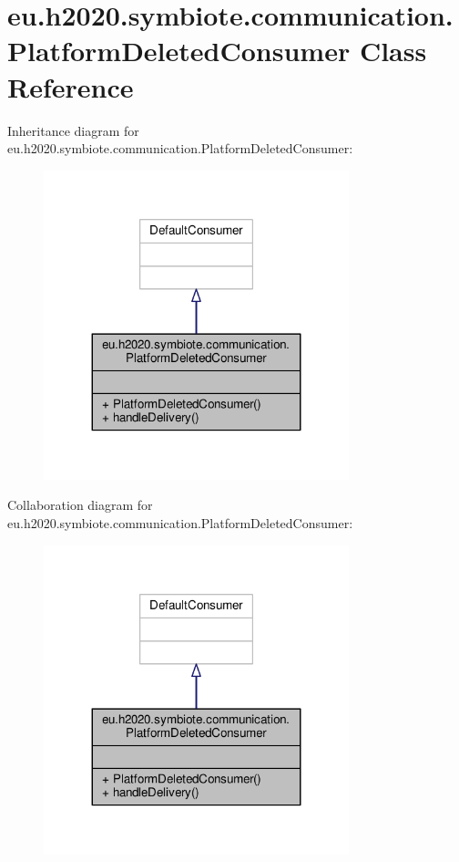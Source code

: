 \hypertarget{classeu_1_1h2020_1_1symbiote_1_1communication_1_1PlatformDeletedConsumer}{}\section{eu.\+h2020.\+symbiote.\+communication.\+Platform\+Deleted\+Consumer Class Reference}
\label{classeu_1_1h2020_1_1symbiote_1_1communication_1_1PlatformDeletedConsumer}


Inheritance diagram for eu.\+h2020.\+symbiote.\+communication.\+Platform\+Deleted\+Consumer\+:
\nopagebreak
\begin{figure}[H]
\begin{center}
\leavevmode
\includegraphics[width=251pt]{classeu_1_1h2020_1_1symbiote_1_1communication_1_1PlatformDeletedConsumer__inherit__graph}
\end{center}
\end{figure}


Collaboration diagram for eu.\+h2020.\+symbiote.\+communication.\+Platform\+Deleted\+Consumer\+:
\nopagebreak
\begin{figure}[H]
\begin{center}
\leavevmode
\includegraphics[width=251pt]{classeu_1_1h2020_1_1symbiote_1_1communication_1_1PlatformDeletedConsumer__coll__graph}
\end{center}
\end{figure}
